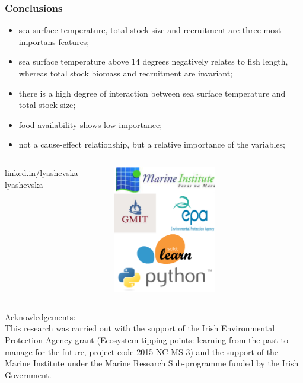\documentclass{beamer}
\begin{document}
\begin{frame}
\frametitle{Conclusions}
\begin{itemize}
    \item <+-| alert@+> sea surface temperature, total stock size and recruitment are three most importans features;
    \item <+-| alert@+> sea surface temperature above 14 degrees negatively relates to fish length, whereas total stock biomass and recruitment are invariant;
    \item <+-| alert@+> there is a high degree of interaction between sea surface temperature and total stock size;
    \item <+-| alert@+> food availability shows low importance; 
    \item <+-| alert@+> not a cause-effect relationship, but a relative importance of the variables;
\end{itemize}
\end{frame}


\begin{frame}
\begin{columns}[c]    
\vspace{1cm}
    \flushleft{}%
    linked.in/lyashevska
    \\
\vspace{-1cm}
    lyashevska
\vspace{0.5cm}
\begin{figure}
    \includegraphics[width=4.5cm]{../fig/logos}
\end{figure}
\end{columns} 

\tiny Acknowledgements: \\

This research was carried out with the support of the Irish Environmental Protection Agency grant (Ecosystem tipping points: learning from the past to manage for the future, project code 2015-NC-MS-3) and the support of the Marine Institute under the Marine Research Sub-programme funded by the Irish Government.  \\
\end{frame}

%
%
\end{document}

